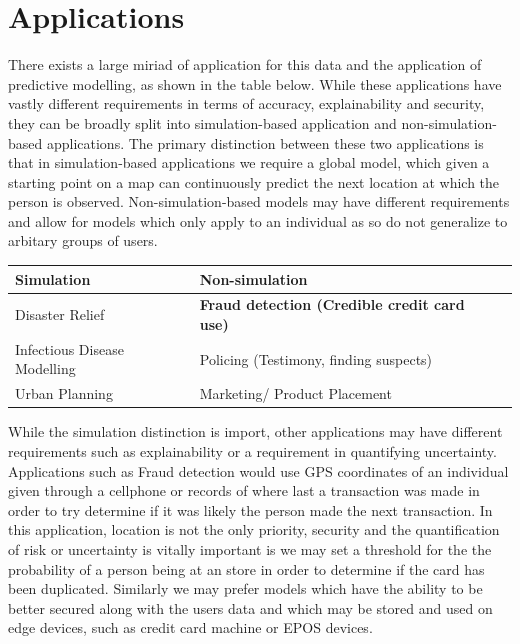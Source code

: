 \documentclass[12pt]{report}
\begin{document}
\section{Applications}
There exists a large miriad of application for this data and the application of predictive modelling, as shown in the table below.  While these applications have vastly different requirements in terms of accuracy, explainability and security, they can be broadly split into simulation-based application and non-simulation-based applications.  The primary distinction between these two applications is that in simulation-based applications we require a global model, which given a starting point on a map can continuously predict the next location at which the person is observed. Non-simulation-based models may have different requirements and allow for models which only apply to an individual as so do not generalize to arbitary groups of users.  \\
\begin{center}
\begin{tabular}{|l|l|l|}
\hline
\textbf{Simulation}          & \textbf{Non-simulation}                    \\ \hline
Disaster Relief              & \textbf{Fraud detection (Credible credit card use)}\\ \hline
Infectious Disease Modelling & Policing (Testimony, finding suspects)       \\ \hline
Urban Planning               & Marketing/ Product Placement               \\ \hline
\end{tabular}
\end{center}

While the simulation distinction is import, other applications may have different requirements such as explainability or a requirement in quantifying uncertainty.  \\
\newline
Applications such as Fraud detection would use GPS coordinates of an individual given through a cellphone or records of where last a transaction was made in order to try determine if it was likely the person made the next transaction.  In this application, location is not the only priority, security and the quantification of risk or uncertainty is vitally important is we may set a threshold for the the probability of a person being at an store in order to determine if the card has been duplicated.  Similarly we may prefer models which have the ability to be better secured along with the users data and which may be stored and used on edge devices, such as credit card machine or EPOS devices.  
\end{document}
